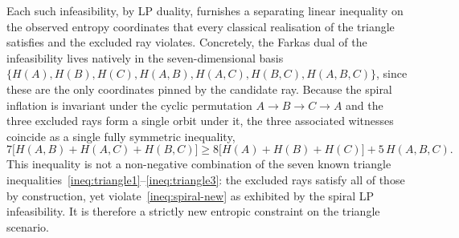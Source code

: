 \documentclass[reprint,pra, twocolumn, amsmath,amssymb,
 aps,superscriptaddress,]{revtex4-2}
\begin{document}
Each such infeasibility, by LP duality, furnishes a separating linear inequality on the observed entropy coordinates that every classical realisation of the triangle satisfies and the excluded ray violates.
Concretely, the Farkas dual of the infeasibility lives natively in the seven-dimensional basis $\{H(A), H(B), H(C), H(A,B), H(A,C), H(B,C), H(A,B,C)\}$, since these are the only coordinates pinned by the candidate ray.
Because the spiral inflation is invariant under the cyclic permutation $A \to B \to C \to A$ and the three excluded rays form a single orbit under it, the three associated witnesses coincide as a single fully symmetric inequality,
\begin{equation}
    7\bigl[H(A,B) + H(A,C) + H(B,C)\bigr] \geq 8\bigl[H(A) + H(B) + H(C)\bigr] + 5\,H(A,B,C). \label{ineq:spiral-new}
\end{equation}
This inequality is not a non-negative combination of the seven known triangle inequalities~\eqref{ineq:triangle1}--\eqref{ineq:triangle3}: the excluded rays satisfy all of those by construction, yet violate~\eqref{ineq:spiral-new} as exhibited by the spiral LP infeasibility.
It is therefore a strictly new entropic constraint on the triangle scenario.



\end{document}

